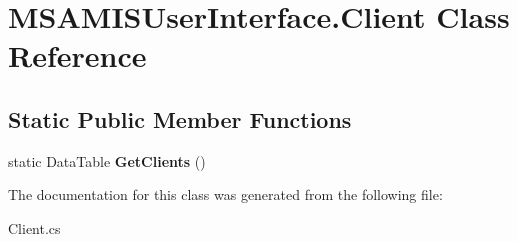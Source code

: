 \hypertarget{class_m_s_a_m_i_s_user_interface_1_1_client}{}\section{M\+S\+A\+M\+I\+S\+User\+Interface.\+Client Class Reference}
\label{class_m_s_a_m_i_s_user_interface_1_1_client}
\subsection*{Static Public Member Functions}
\begin{DoxyCompactItemize}
\item 
\mbox{\label{class_m_s_a_m_i_s_user_interface_1_1_client_aa99c073d89e965fffcc51fc246bfb4a2}} 
static Data\+Table {\bfseries Get\+Clients} ()
\end{DoxyCompactItemize}


The documentation for this class was generated from the following file\+:\begin{DoxyCompactItemize}
\item 
Client.\+cs\end{DoxyCompactItemize}
